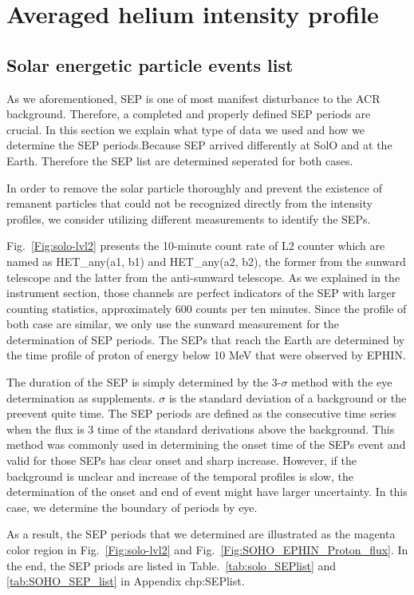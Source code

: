 \section{Averaged helium intensity profile}
\subsection*{Solar energetic particle events list}

As we aforementioned, \ac{SEP} is one of most manifest disturbance to the \ac{ACR} background. Therefore, a completed and properly defined \ac{SEP} periods are crucial. In this section we explain what type of data we used and how we determine the \ac{SEP} periods.Because \ac{SEP} arrived differently at \ac{SolO} and at the Earth. Therefore the \ac{SEP} list are determined seperated for both cases.

In order to remove the solar particle thoroughly and prevent the existence of remanent particles that could not be recognized directly from the intensity profiles, we consider utilizing different measurements to identify the \acp{SEP}.

Fig.~\ref{Fig:solo-lvl2} presents the 10-minute count rate of L2 counter which are named as HET\_any(a1, b1) and HET\_any(a2, b2), the former from the sunward telescope and the latter from the anti-sunward telescope. As we explained in the instrument section, those channels are perfect indicators of the \ac{SEP} with larger counting statistics, approximately 600 counts per ten minutes. Since the profile of both case are similar, we only use the sunward measurement for the determination of \ac{SEP} periods. The \acp{SEP} that reach the Earth are determined by the time profile of proton of energy below 10 MeV that were observed by \ac{EPHIN}.

The duration of the SEP is simply determined by the 3-$\sigma$ method with the eye determination as supplements. $\sigma$ is the standard deviation of a background or the preevent quite time. The \ac{SEP} periods are defined as the consecutive time series when the flux is 3 time of the standard derivations above the background. This method was commonly used in determining the onset time of the SEPs event and valid for those SEPs has clear onset and sharp increase. 
However, if the background is unclear and increase of the temporal profiles is slow, the determination of the onset and end of event might have larger uncertainty. In this case, we determine the boundary of periods by eye.

As a result, the \ac{SEP} periods that we determined are illustrated as the magenta color region in Fig.~\ref{Fig:solo-lvl2} and Fig.~\ref{Fig:SOHO_EPHIN_Proton_flux}. In the end, the \ac{SEP} priods are listed in Table.~\ref{tab:solo_SEPlist} and \ref{tab:SOHO_SEP_list} in Appendix {chp:SEPlist}.



